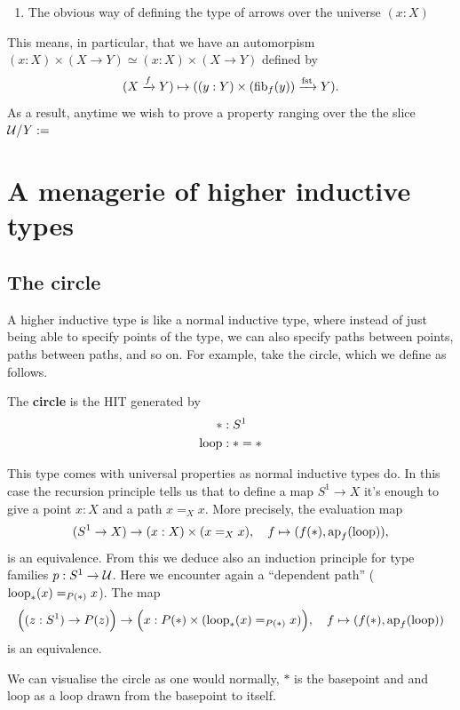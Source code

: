 \documentclass[10pt,oneside,leqno,openright]{memoir}
\begin{document}
\begin{enumerate}
\begin{enumerate}
  \item The obvious way of defining the type of arrows over the universe $(x:X)$
\end{enumerate}
This means, in particular, that we have an automorpism $(x:X) \times (X \to Y) \simeq (x : X) \times(X \to Y)$ defined by
\[(X \xrightarrow{f} Y) \mapsto ((y : Y) \times (\operatorname{fib}_f(y)) \xrightarrow{\operatorname{fst}} Y).\]
As a result, anytime we wish to prove a property ranging over the the slice $\mathcal{U}/Y := $

\end{enumerate}

\chapter{A menagerie of higher inductive types}

\section{The circle}

A higher inductive type is like a normal inductive type, where instead of just being able to specify points of the type, we can also specify paths between points, paths between paths, and so on.
For example, take the circle, which we define as follows.
\begin{definition}
    The \textbf{circle} is the HIT generated by
    \begin{align*}
        \ast &: S^1 \\
        \mathrm{loop} &: \ast = \ast
    \end{align*}
\end{definition}
This type comes with universal properties as normal inductive types do.
In this case the recursion principle tells us that to define a map $S^1 \to X$ it's enough to give a point $x : X$ and a path $x =_X x$. More precisely, the evaluation map
\[
  (S^1 \to X) \to (x : X) \times (x=_X x),
  \quad
  f \mapsto (f(\ast), \operatorname{ap}_f(\mathrm{loop})),
\]
is an equivalence. From this we deduce also an induction principle for type families $p : S^1 \to \mathcal{U}$. Here we encounter again a ``dependent path'' ($\mathrm{loop}_*(x) =_{P(\ast)} x$). The map
\[
  \Bigl((z : S^1) \to P(z)\Bigr) \to \Bigl(x : P(\ast) \times (\mathrm{loop}_*(x)
  =_{P(\ast)} x)\Bigr),
  \quad f \mapsto (f(\ast), \operatorname{ap}_f(\mathrm{loop}))
\]
is an
equivalence.

We can visualise the circle as one would normally, $\ast$ is the basepoint and and $\mathrm{loop}$ as a loop drawn from the basepoint to itself.
\end{document}
